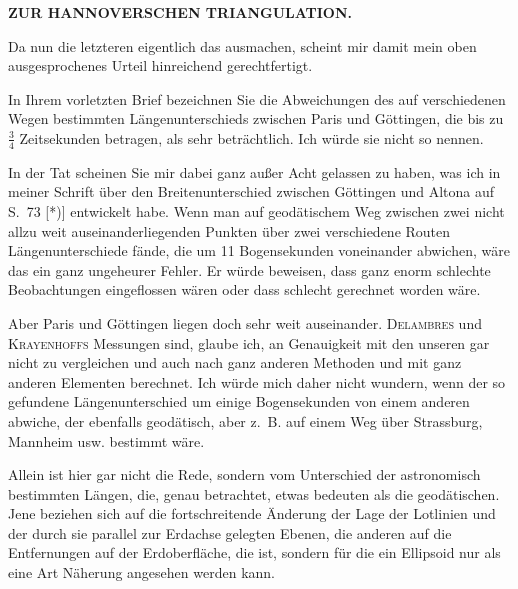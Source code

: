 \par\clearpage
\noindent\null\hfill{\small\textbf{ZUR HANNOVERSCHEN TRIANGULATION.}}\hfill{}\par\medskip
\par\noindent\hspace*{\parindent}Da nun die letzteren eigentlich das  ausmachen, scheint mir damit mein oben ausgesprochenes Urteil hinreichend gerechtfertigt.
\par\noindent\hspace*{\parindent}In Ihrem vorletzten Brief bezeichnen Sie die Abweichungen des auf verschiedenen Wegen bestimmten Längenunterschieds zwischen Paris und Göttingen, die bis zu \(\frac{3}{4}\) Zeitsekunden betragen, als sehr beträchtlich. Ich würde sie nicht so nennen.
\par\noindent\hspace*{\parindent}In der Tat scheinen Sie mir dabei ganz außer Acht gelassen zu haben, was ich in meiner Schrift über den Breitenunterschied zwischen Göttingen und Altona auf S.~73 [*)] entwickelt habe. Wenn man auf geodätischem Weg zwischen zwei nicht allzu weit auseinanderliegenden Punkten über zwei verschiedene Routen Längenunterschiede fände, die um 11 Bogensekunden voneinander abwichen, wäre das ein ganz ungeheurer Fehler. Er würde beweisen, dass ganz enorm schlechte Beobachtungen eingeflossen wären oder dass schlecht gerechnet worden wäre.
\par\noindent\hspace*{\parindent}Aber Paris und Göttingen liegen doch sehr weit auseinander. \textsc{Delambres} und \textsc{Krayenhoffs} Messungen sind, glaube ich, an Genauigkeit mit den unseren gar nicht zu vergleichen und auch nach ganz anderen Methoden und mit ganz anderen Elementen berechnet. Ich würde mich daher nicht wundern, wenn der so gefundene Längenunterschied um einige Bogensekunden von einem anderen abwiche, der ebenfalls geodätisch, aber z.~B. auf einem Weg über Strassburg, Mannheim usw. bestimmt wäre.
\par\noindent\hspace*{\parindent}Allein  ist hier gar nicht die Rede, sondern vom Unterschied der astronomisch bestimmten Längen, die, genau betrachtet, etwas  bedeuten als die geodätischen. Jene beziehen sich auf die fortschreitende Änderung der Lage der Lotlinien und der durch sie parallel zur Erdachse gelegten Ebenen, die anderen auf die Entfernungen auf der Erdoberfläche, die  ist, sondern für die ein Ellipsoid nur als eine Art Näherung angesehen werden kann.
